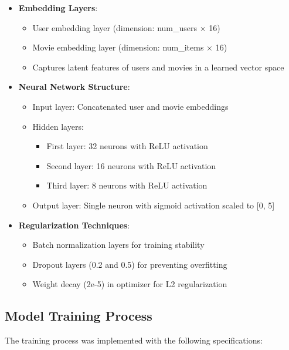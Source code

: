 \documentclass[12pt]{article}
\begin{document}
\begin{itemize}
    \item \textbf{Embedding Layers}:
    \begin{itemize}
        \item User embedding layer (dimension: num\_users × 16)
        \item Movie embedding layer (dimension: num\_items × 16)
        \item Captures latent features of users and movies in a learned vector space
    \end{itemize}
    
    \item \textbf{Neural Network Structure}:
    \begin{itemize}
        \item Input layer: Concatenated user and movie embeddings
        \item Hidden layers:
        \begin{itemize}
            \item First layer: 32 neurons with ReLU activation
            \item Second layer: 16 neurons with ReLU activation
            \item Third layer: 8 neurons with ReLU activation
        \end{itemize}
        \item Output layer: Single neuron with sigmoid activation scaled to [0, 5]
    \end{itemize}
    
    \item \textbf{Regularization Techniques}:
    \begin{itemize}
        \item Batch normalization layers for training stability
        \item Dropout layers (0.2 and 0.5) for preventing overfitting
        \item Weight decay (2e-5) in optimizer for L2 regularization
    \end{itemize}
\end{itemize}

\subsection{Model Training Process}
The training process was implemented with the following specifications:
\end{document}
